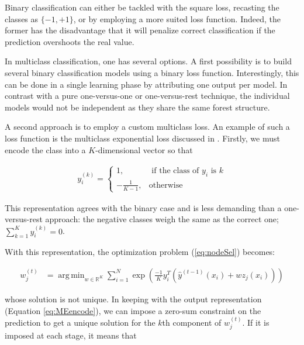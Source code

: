 \documentclass{article}
\DeclareMathOperator*{\argmin}{arg\,min}
\begin{document}
Binary classification can either be tackled with the square loss, recasting the 
classes as $\{-1, +1\}$, or by employing a more suited loss function. Indeed, 
the former has the disadvantage that it will penalize correct classification if 
the prediction overshoots the real value.

In multiclass classification, one has several options. A first possibility is 
to build several binary classification models using a binary loss function. 
Interestingly, this can be done in a single learning phase by attributing one 
output per model. In contrast with a pure one-versus-one or one-versus-rest 
technique, the individual models would not be independent as they share the 
same forest structure.

A second approach is to employ a custom multiclass loss. An example of such a 
loss function is the multiclass exponential loss discussed in 
\cite{zhu2009multiadaboost}. Firstly, we must encode the class into a 
$K$-dimensional vector so that

\vspace*{-\baselineskip}
\begin{align}\label{eq:MEencode}
y_i^{(k)} = \begin{cases}
1, &\text{ if the class of } y_i \text{ is } k \\
-\frac{1}{K-1}, &\text{otherwise}
\end{cases}
\end{align}
\vspace*{-\baselineskip}

This representation agrees with the binary case and is less demanding than a 
one-versus-rest approach: the negative classes weigh the same as the correct 
one; $\sum_{k=1}^{K} y_i^{(k)} = 0$.

With this representation, the optimization problem (\ref{eq:nodeSel}) becomes:

\vspace*{-\baselineskip}
\begin{align}\label{eq:MEmin}
w_j^{(t)} &=  \argmin_{w \in \mathbb{R}^K} \sum_{i=1}^N \exp 
\left(\frac{-1}{K} y_i^T \left(\hat{y}^{(t-1)}(x_i) + w z_j(x_i) \right)\right)
\end{align}
\vspace*{-\baselineskip}

whose solution is not unique.
In keeping with the output representation (Equation \ref{eq:MEencode}), we can 
impose a zero-sum constraint on the prediction to get a unique solution for the 
$k$th component of $w_j^{(t)}$. If it is imposed at each stage, it means that
\end{document}
